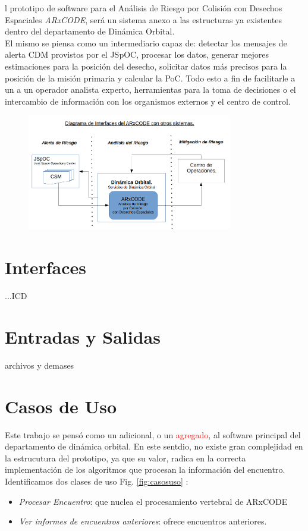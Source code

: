l prototipo de software para el An\'alisis de Riesgo por Colisi\'on con Desechos Espaciales {\it{ARxCODE}}, ser\'a un sistema anexo a las estructuras ya existentes dentro del departamento de Din\'amica Orbital.\\
El mismo se piensa como un intermediario capaz de: detectar los mensajes de alerta CDM provistos por el JSpOC, procesar los datos, generar mejores estimaciones para la posici\'on del desecho, solicitar datos m\'as precisos para la posici\'on de la misi\'on primaria y calcular la PoC. Todo esto a fin de facilitarle a un a un operador analista experto, herramientas para la toma de decisiones o el intercambio de informaci\'on con los organismos externos y el centro de control.\\

\begin{figure}
  \includegraphics[width=0.8\textwidth]{imagenes/interfasessistemas}
\end{figure}

\section{Interfaces}

...ICD
\section{Entradas y Salidas}

archivos y demases

\section{Casos de Uso}

Este trabajo se pens\'o como un adicional, o un \textcolor{red}{agregado}, al software principal del departamento de din\'amica orbital. En este sentdio, no existe gran complejidad en la estrucutura del prototipo, ya que su valor, radica en la correcta implementaci\'on de los algoritmos que procesan la informaci\'on del encuentro.\\
Identificamos dos clases de uso Fig. \ref{fig:casosuso} :\\
\begin{itemize}
 \item {\it{Procesar Encuentro}}: que nuclea el procesamiento vertebral de ARxCODE
 \item {\it{Ver informes de encuentros anteriores}}: ofrece encuentros anteriores.
\end{itemize}

